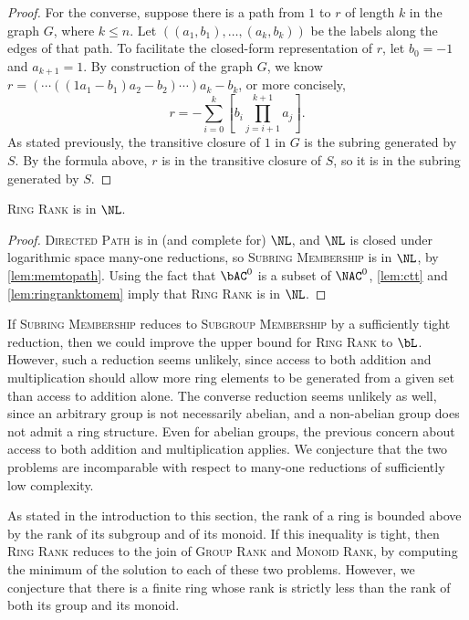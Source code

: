 \documentclass{article}
\begin{document}
\begin{proof}
  For the converse, suppose there is a path from $1$ to $r$ of length $k$ in the graph $G$, where $k \leq n$.
  Let $((a_1, b_1), \dotsc, (a_k, b_k))$ be the labels along the edges of that path.
  To facilitate the closed-form representation of $r$, let $b_0 = -1$ and $a_{k + 1} = 1$.
  By construction of the graph $G$, we know $r = (\dotsb ((1 a_1 - b_1) a_2 - b_2) \dotsb) a_k - b_k$, or more concisely,
  \begin{equation*}
    r = -\sum_{i = 0}^k \left[b_i \prod_{j = i + 1}^{k + 1} a_j\right].
  \end{equation*}
  As stated previously, the transitive closure of $1$ in $G$ is the subring generated by $S$.
  By the formula above, $r$ is in the transitive closure of $S$, so it is in the subring generated by $S$.
\end{proof}

\begin{theorem}\label{thm:ringrank}
  \textsc{Ring Rank} is in $\NL$.
\end{theorem}
\begin{proof}
  \textsc{Directed Path} is in (and complete for) $\NL$, and $\NL$ is closed under logarithmic space many-one reductions, so \textsc{Subring Membership} is in $\NL$, by \autoref{lem:memtopath}.
  Using the fact that $\bAC^0$ is a subset of $\NAC^0$, \autoref{lem:ctt} and \autoref{lem:ringranktomem} imply that \textsc{Ring Rank} is in $\NL$.
\end{proof}

If \textsc{Subring Membership} reduces to \textsc{Subgroup Membership} by a sufficiently tight reduction, then we could improve the upper bound for \textsc{Ring Rank} to $\bL$.
However, such a reduction seems unlikely, since access to both addition and multiplication should allow more ring elements to be generated from a given set than access to addition alone.
The converse reduction seems unlikely as well, since an arbitrary group is not necessarily abelian, and a non-abelian group does not admit a ring structure.
Even for abelian groups, the previous concern about access to both addition and multiplication applies.
We conjecture that the two problems are incomparable with respect to many-one reductions of sufficiently low complexity.

As stated in the introduction to this section, the rank of a ring is bounded above by the rank of its subgroup and of its monoid.
If this inequality is tight, then \textsc{Ring Rank} reduces to the join of \textsc{Group Rank} and \textsc{Monoid Rank}, by computing the minimum of the solution to each of these two problems.
However, we conjecture that there is a finite ring whose rank is strictly less than the rank of both its group and its monoid.

\printbibliography
\end{document}

